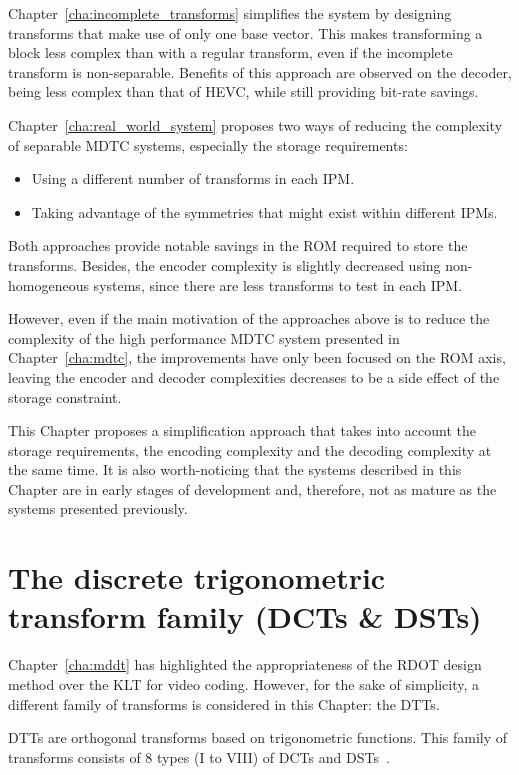 \documentclass[11pt,a4paper,openright,twoside]{book}
\numberwithin{equation}{section} %
\numberwithin{figure}{section} %
\numberwithin{table}{section} %
\begin{document}
Chapter~\ref{cha:incomplete_transforms} simplifies the system by designing
transforms that make use of only one base vector.
This makes transforming a block less complex than with a regular transform,
even if the incomplete transform is non-separable.
Benefits of this approach are observed on the decoder, being less complex than
that of \ac{HEVC}, while still providing bit-rate savings.

Chapter~\ref{cha:real_world_system} proposes two ways of reducing the
complexity of separable \ac{MDTC} systems, especially the storage
requirements:
\begin{itemize}
	\item Using a different number of transforms in each \ac{IPM}.
	\item Taking advantage of the symmetries that might exist within different
		\acp{IPM}.
\end{itemize}
Both approaches provide notable savings in the \acs{ROM} required to store the
transforms.
Besides, the encoder complexity is slightly decreased using non-homogeneous
systems, since there are less transforms to test in each \ac{IPM}.

However, even if the main motivation of the approaches above is to reduce the
complexity of the high performance \ac{MDTC} system presented in
Chapter~\ref{cha:mdtc}, the improvements have only been focused on the
\acs{ROM} axis, leaving the encoder and decoder complexities decreases to be a
side effect of the storage constraint.

This Chapter proposes a simplification approach that takes into account the
storage requirements, the encoding complexity and the decoding complexity at
the same time.
It is also worth-noticing that the systems described in this Chapter are in
early stages of development and, therefore, not as mature as the systems
presented previously.

\section{The discrete trigonometric transform family (\acsp{DCT} \& \acsp{DST})}
\label{sec:the_dtt_family}

Chapter~\ref{cha:mddt} has highlighted the appropriateness of the \ac{RDOT}
design method over the \ac{KLT} for video coding.
However, for the sake of simplicity, a different family of transforms is
considered in this Chapter: the \acfp{DTT}.

\acsp{DTT} are orthogonal transforms based on trigonometric functions.
This family of transforms consists of 8 types (I to VIII) of \acfp{DCT} and
\acfp{DST}~\cite{rao-01-transform-data-compression-book,
puschel-08-algorithms-dct-dst}.
\end{document}
